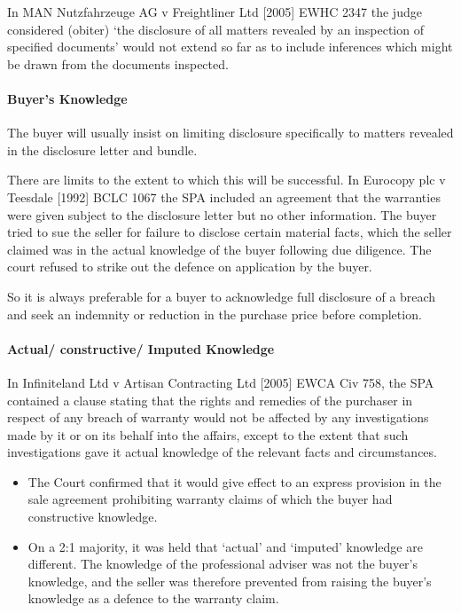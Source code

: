 \documentclass[
]{article}
\providecommand{\tightlist}{%
  \setlength{\itemsep}{0pt}\setlength{\parskip}{0pt}}
\begin{document}
In MAN Nutzfahrzeuge AG v Freightliner Ltd {[}2005{]} EWHC 2347 the
judge considered (obiter) `the disclosure of all matters revealed by an
inspection of specified documents' would not extend so far as to include
inferences which might be drawn from the documents inspected.

\hypertarget{buyers-knowledge}{%
\paragraph{Buyer's Knowledge}\label{buyers-knowledge}}

The buyer will usually insist on limiting disclosure specifically to
matters revealed in the disclosure letter and bundle.

There are limits to the extent to which this will be successful. In
Eurocopy plc v Teesdale {[}1992{]} BCLC 1067 the SPA included an
agreement that the warranties were given subject to the disclosure
letter but no other information. The buyer tried to sue the seller for
failure to disclose certain material facts, which the seller claimed was
in the actual knowledge of the buyer following due diligence. The court
refused to strike out the defence on application by the buyer.

So it is always preferable for a buyer to acknowledge full disclosure of
a breach and seek an indemnity or reduction in the purchase price before
completion.

\hypertarget{actual-constructive-imputed-knowledge}{%
\paragraph{Actual/ constructive/ Imputed
Knowledge}\label{actual-constructive-imputed-knowledge}}

In Infiniteland Ltd v Artisan Contracting Ltd {[}2005{]} EWCA Civ 758,
the SPA contained a clause stating that the rights and remedies of the
purchaser in respect of any breach of warranty would not be affected by
any investigations made by it or on its behalf into the affairs, except
to the extent that such investigations gave it actual knowledge of the
relevant facts and circumstances.

\begin{itemize}
\tightlist
\item
  The Court confirmed that it would give effect to an express provision
  in the sale agreement prohibiting warranty claims of which the buyer
  had constructive knowledge.
\item
  On a 2:1 majority, it was held that `actual' and `imputed' knowledge
  are different. The knowledge of the professional adviser was not the
  buyer's knowledge, and the seller was therefore prevented from raising
  the buyer's knowledge as a defence to the warranty claim.
\end{itemize}
\end{document}
